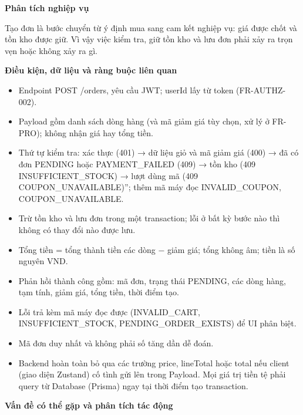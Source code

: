 \documentclass[11pt,a4paper,oneside]{report}
\begin{document}
\textbf{Phân tích nghiệp vụ}

Tạo đơn là bước chuyển từ ý định mua sang cam kết nghiệp vụ: giá được chốt và tồn kho được giữ. Vì vậy việc kiểm tra, giữ tồn kho và lưu đơn phải xảy ra trọn vẹn hoặc không xảy ra gì.

\textbf{Điều kiện, dữ liệu và ràng buộc liên quan}

\begin{itemize}
\item
  Endpoint POST /orders, yêu cầu JWT; userId lấy từ token (FR-AUTHZ-002).
\item
  Payload gồm danh sách dòng hàng (và mã giảm giá tùy chọn, xử lý ở FR-PRO); không nhận giá hay tổng tiền.
\item
  Thứ tự kiểm tra: xác thực (401) → dữ liệu giỏ và mã giảm giá (400) → đã có đơn PENDING hoặc PAYMENT\_FAILED (409) → tồn kho (409 INSUFFICIENT\_STOCK) → lượt dùng mã (409 COUPON\_UNAVAILABLE)''; thêm mã máy đọc INVALID\_COUPON, COUPON\_UNAVAILABLE.
\item
  Trừ tồn kho và lưu đơn trong một transaction; lỗi ở bất kỳ bước nào thì không có thay đổi nào được lưu.
\item
  Tổng tiền = tổng thành tiền các dòng − giảm giá; tổng không âm; tiền là số nguyên VND.
\item
  Phản hồi thành công gồm: mã đơn, trạng thái PENDING, các dòng hàng, tạm tính, giảm giá, tổng tiền, thời điểm tạo.
\item
  Lỗi trả kèm mã máy đọc được (INVALID\_CART, INSUFFICIENT\_STOCK, PENDING\_ORDER\_EXISTS) để UI phân biệt.
\item
  Mã đơn duy nhất và không phải số tăng dần dễ đoán.
\item
  Backend hoàn toàn bỏ qua các trường price, lineTotal hoặc total nếu client (giao diện Zustand) cố tình gửi lên trong Payload. Mọi giá trị tiền tệ phải query từ Database (Prisma) ngay tại thời điểm tạo transaction.
\end{itemize}

\textbf{Vấn đề có thể gặp và phân tích tác động}
\end{document}
